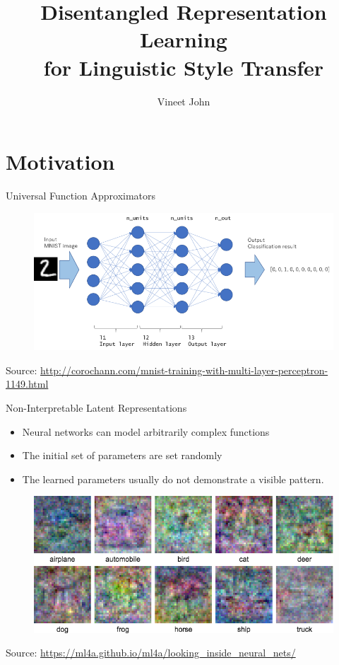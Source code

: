 \documentclass[aspectratio=169]{beamer}
\title{
	Disentangled Representation Learning\\
	for Linguistic Style Transfer}
\date{}
\author{Vineet John}
\institute{University of Waterloo}
\newcommand{\imgsrc}[1]{\tiny{Source: #1}}
\begin{document}
\maketitle

\graphicspath{{images/}}

\section{Motivation}

\begin{frame}{Universal Function Approximators}
	\centering
	\begin{figure}[ht]
		\includegraphics[width=\linewidth]{mlp-network}
	\end{figure}

    \imgsrc{\url{http://corochann.com/mnist-training-with-multi-layer-perceptron-1149.html}}
\end{frame}

\begin{frame}{Non-Interpretable Latent Representations}
	\begin{itemize}
		\item Neural networks can model arbitrarily complex functions
        \item The initial set of parameters are set randomly
        \item The learned parameters usually do not demonstrate a visible pattern.
	\end{itemize}

    \centering
    \begin{figure}[ht]
		\includegraphics[width=0.6\linewidth]{uninterpretable-weights}
	\end{figure}
    
    \imgsrc{\url{https://ml4a.github.io/ml4a/looking_inside_neural_nets/}}
\end{frame}
\end{document}
